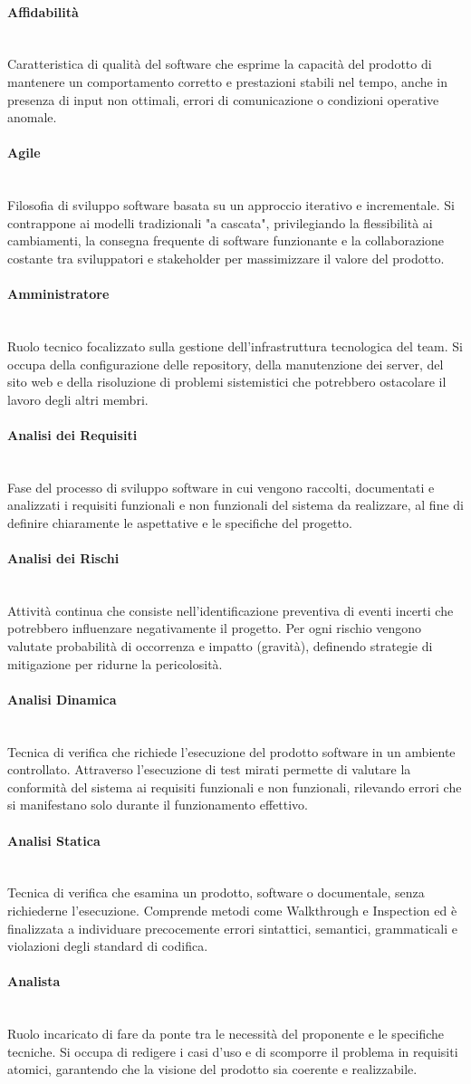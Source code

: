 \documentclass[a4paper, 10pt, colorlinks=true, linkcolor=black, urlcolor=blue, citecolor=blue, hidelinks]{article}
\newcommand{\glossaryterm}[2]{
    \paragraph{#1 \label{term:#1}} \mbox{} \\
    #2
    \vspace{0.5em}
}
\begin{document}
\glossaryterm{Affidabilità}{Caratteristica di qualità del software che esprime la capacità del prodotto di mantenere un comportamento corretto e prestazioni stabili nel tempo, anche in presenza di input non ottimali, errori di comunicazione o condizioni operative anomale.}

\glossaryterm{Agile}{Filosofia di sviluppo software basata su un approccio iterativo e incrementale. Si contrappone ai modelli tradizionali "a cascata", privilegiando la flessibilità ai cambiamenti, la consegna frequente di software funzionante e la collaborazione costante tra sviluppatori e stakeholder per massimizzare il valore del prodotto.}

\glossaryterm{Amministratore}{Ruolo tecnico focalizzato sulla gestione dell'infrastruttura tecnologica del team. Si occupa della configurazione delle repository, della manutenzione dei server, del sito web e della risoluzione di problemi sistemistici che potrebbero ostacolare il lavoro degli altri membri.}

\glossaryterm{Analisi dei Requisiti}{Fase del processo di sviluppo software in cui vengono raccolti, documentati e analizzati i requisiti funzionali e non funzionali del sistema da realizzare, al fine di definire chiaramente le aspettative e le specifiche del progetto.}

\glossaryterm{Analisi dei Rischi}{Attività continua che consiste nell'identificazione preventiva di eventi incerti che potrebbero influenzare negativamente il progetto. Per ogni rischio vengono valutate probabilità di occorrenza e impatto (gravità), definendo strategie di mitigazione per ridurne la pericolosità.}

\glossaryterm{Analisi Dinamica}{Tecnica di verifica che richiede l'esecuzione del prodotto software in un ambiente controllato. Attraverso l'esecuzione di test mirati permette di valutare la conformità del sistema ai requisiti funzionali e non funzionali, rilevando errori che si manifestano solo durante il funzionamento effettivo.}

\glossaryterm{Analisi Statica}{Tecnica di verifica che esamina un prodotto, software o documentale, senza richiederne l'esecuzione. Comprende metodi come Walkthrough e Inspection ed è finalizzata a individuare precocemente errori sintattici, semantici, grammaticali e violazioni degli standard di codifica.}

\glossaryterm{Analista}{Ruolo incaricato di fare da ponte tra le necessità del proponente e le specifiche tecniche. Si occupa di redigere i casi d'uso e di scomporre il problema in requisiti atomici, garantendo che la visione del prodotto sia coerente e realizzabile.}
\end{document}
